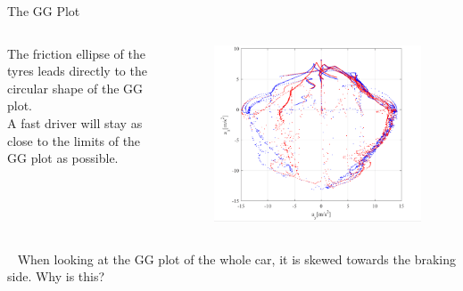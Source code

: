 \begin{frame}{The GG Plot}
    \begin{columns}
        The friction ellipse of the tyres
        leads directly to the circular shape of the GG plot. \\
        \vspace{2ex}
        A fast driver will stay as close to the limits
        of the GG plot as possible.
        \begin{figure}
            \includegraphics[width=\textwidth]{res/GG Plot.png}
        \end{figure}
    \end{columns}
    \begin{block}{~}
        When looking at the GG plot of the whole car,
        it is skewed towards the braking side.
        Why is this?
    \end{block}
\end{frame}

